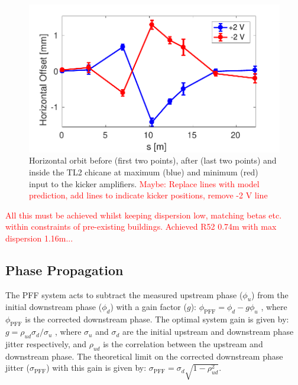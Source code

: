 \documentclass[%
 reprint,
 amsmath,amssymb,
 prl,
]{revtex4-1}
\begin{document}
\begin{figure}
	\includegraphics[width=\columnwidth]{figs/orbClos}
	\caption{\label{fig:orbClos}Horizontal orbit before (first two points), 
	after (last two points) and inside the TL2 chicane at maximum (blue) and 
	minimum (red) 
	input to the kicker amplifiers. \textcolor{red}{Maybe: Replace 
	lines with model 
	prediction, add lines to indicate kicker positions, remove -2 V 
	line}}
\end{figure}

\textcolor{red}{All this must be achieved whilst keeping dispersion low, matching betas etc. 
within constraints of pre-existing buildings. Achieved R52 0.74m with max 
dispersion 1.16m...}

\subsection{\label{ss:r56} Phase Propagation}

The PFF system acts to subtract the measured upstream phase (\(\phi_u\)) from 
the initial downstream phase (\(\phi_d\)) with a gain factor (\(g\)):
\(\phi_{\mathrm{PFF}} = \phi_d - g\phi_u\)
, where \(\phi_{\mathrm{PFF}}\) is the corrected downstream phase. The optimal 
system gain is given by:
\(g = \rho_{ud} \sigma_d/\sigma_u\)
, where \(\sigma_u\) and \(\sigma_d\) are the initial upstream and downstream 
phase jitter respectively, and \(\rho_{ud}\) is the correlation between the 
upstream and downstream phase. The theoretical limit on the corrected 
downstream phase jitter (\(\sigma_{\mathrm{PFF}}\)) with this gain is given by:
\(\sigma_{\mathrm{PFF}}=\sigma_d \sqrt{1-\rho_{ud}^2}\). 
\end{document}
